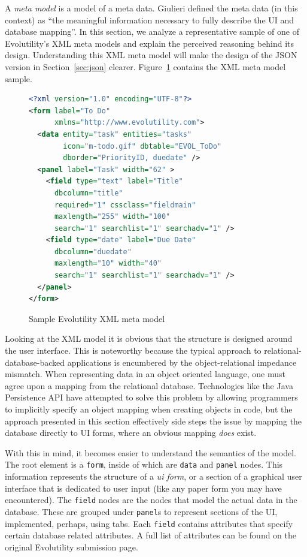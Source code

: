 \documentclass[journal]{IEEEtran}
\begin{document}
A \textit{meta model} is a model of a meta data. Giulieri defined the meta data (in this context) as ``the meaningful information necessary to fully describe the UI and database mapping''. In this section, we analyze a representative sample of one of Evolutility's XML meta models and explain the perceived reasoning behind its design. Understanding this XML meta model will make the design of the JSON version in Section~\ref{sec:json} clearer. Figure~\ref{fig:xml} contains the XML meta model sample.

\begin{figure}[h!]
\centering
\begin{lstlisting}[language=XML]
<?xml version="1.0" encoding="UTF-8"?>
<form label="To Do"  
      xmlns="http://www.evolutility.com">
  <data entity="task" entities="tasks" 
        icon="m-todo.gif" dbtable="EVOL_ToDo" 
        dborder="PriorityID, duedate" />
  <panel label="Task" width="62" >
    <field type="text" label="Title" 
      dbcolumn="title"
      required="1" cssclass="fieldmain" 
      maxlength="255" width="100" 
      search="1" searchlist="1" searchadv="1" />
    <field type="date" label="Due Date" 
      dbcolumn="duedate" 
      maxlength="10" width="40" 
      search="1" searchlist="1" searchadv="1" />
  </panel>
</form> 
\end{lstlisting}
\caption{Sample Evolutility XML meta model}
\label{fig:xml}
\end{figure}

Looking at the XML model it is obvious that the structure is designed around the user interface. This is noteworthy because the typical approach to relational-database-backed applications is encumbered by the object-relational impedance mismatch. When representing data in an object oriented language, one must agree upon a mapping from the relational database. Technologies like the Java Persistence API have attempted to solve this problem by allowing programmers to implicitly specify an object mapping when creating objects in code\cite{oracle_java_????}, but the approach presented in this section effectively side steps the issue by mapping the database directly to UI forms, where an obvious mapping \textit{does} exist.

With this in mind, it becomes easier to understand the semantics of the model. The root element is a \texttt{form}, inside of which are \texttt{data} and \texttt{panel} nodes. This information represents the structure of a \textit{ui form}, or a section of a graphical user interface that is dedicated to user input (like any paper form you may have encountered). The \texttt{field} nodes are the nodes that model the actual data in the database. These are grouped under \texttt{panel}s to represent sections of the UI, implemented, perhaps, using tabs. Each \texttt{field} contains attributes that specify certain database related attributes. A full list of attributes can be found on the original Evolutility submission page\cite{giulieri_minimalist_2011}.
\end{document}
